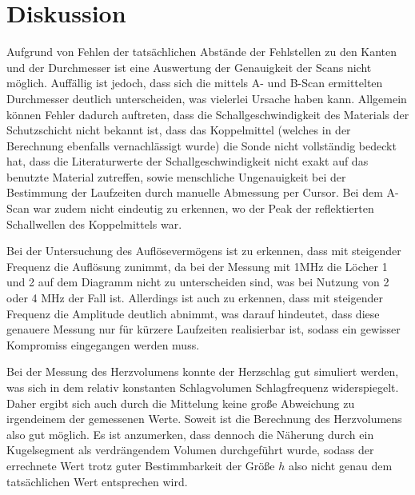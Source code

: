 \section{Diskussion}
\label{sec:Diskussion}

Aufgrund von Fehlen der tatsächlichen Abstände der Fehlstellen zu den Kanten und der Durchmesser
ist eine Auswertung der Genauigkeit der Scans nicht möglich. Auffällig ist jedoch, dass sich
die mittels A- und B-Scan ermittelten Durchmesser deutlich unterscheiden, was vielerlei
Ursache haben kann.
Allgemein können Fehler dadurch auftreten, dass die Schallgeschwindigkeit des
Materials der Schutzschicht nicht bekannt ist, dass das Koppelmittel (welches in der 
Berechnung ebenfalls vernachlässigt wurde) die Sonde nicht vollständig bedeckt hat, dass
die Literaturwerte der Schallgeschwindigkeit nicht exakt auf das benutzte Material zutreffen,
sowie menschliche Ungenauigkeit bei der Bestimmung der Laufzeiten durch manuelle Abmessung 
per Cursor.
Bei dem A-Scan war zudem nicht eindeutig zu erkennen, wo der Peak der reflektierten Schallwellen des Koppelmittels war.

Bei der Untersuchung des Auflösevermögens ist zu erkennen, dass mit steigender Frequenz die Auflösung zunimmt, da bei
der Messung mit 1MHz die Löcher 1 und 2 auf dem Diagramm nicht zu unterscheiden sind, was bei Nutzung von 2 oder 4
MHz der Fall ist. Allerdings ist auch zu erkennen, dass mit steigender Frequenz die Amplitude deutlich abnimmt, was
darauf hindeutet, dass diese genauere Messung nur für kürzere Laufzeiten realisierbar ist, sodass ein gewisser
Kompromiss eingegangen werden muss.

Bei der Messung des Herzvolumens konnte der Herzschlag gut simuliert werden, was sich in dem relativ konstanten Schlagvolumen
Schlagfrequenz widerspiegelt. Daher ergibt sich auch durch die Mittelung keine große Abweichung zu irgendeinem der gemessenen Werte. Soweit ist
die Berechnung des Herzvolumens also gut möglich. Es ist anzumerken, dass dennoch die Näherung durch ein Kugelsegment
als verdrängendem Volumen durchgeführt wurde, sodass der errechnete Wert trotz guter Bestimmbarkeit der Größe $h$ also
 nicht genau dem tatsächlichen Wert entsprechen wird.